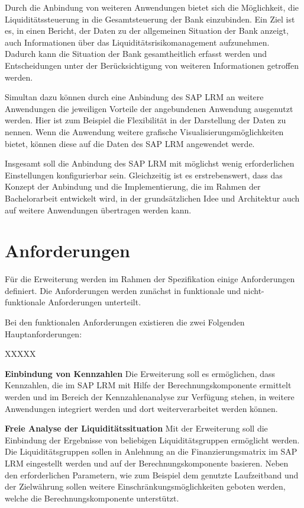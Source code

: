 \begin{onehalfspacing}
Durch die Anbindung von weiteren Anwendungen bietet sich die Möglichkeit, die  Liquiditätssteuerung in die Gesamtsteuerung der Bank einzubinden. Ein Ziel ist es, in einen Bericht, der Daten zu der allgemeinen Situation der Bank anzeigt, auch Informationen über das Liquiditätsrisikomanagement aufzunehmen. Dadurch kann die Situation der Bank gesamtheitlich erfasst werden und Entscheidungen unter der Berücksichtigung von weiteren Informationen getroffen werden.

Simultan dazu können durch eine Anbindung des SAP LRM an weitere Anwendungen die jeweiligen Vorteile der angebundenen Anwendung ausgenutzt werden. Hier ist zum Beispiel die Flexibilität in der Darstellung der Daten zu nennen. Wenn die Anwendung weitere grafische Visualisierungsmöglichkeiten bietet, können diese auf die Daten des SAP LRM angewendet werde.

Insgesamt soll die Anbindung des SAP LRM mit möglichst wenig erforderlichen Einstellungen konfigurierbar sein. Gleichzeitig ist es erstrebenswert, dass das Konzept der Anbindung und die Implementierung, die im Rahmen der Bachelorarbeit entwickelt wird, in der grundsätzlichen Idee und Architektur auch auf weitere Anwendungen übertragen werden kann.

\section{Anforderungen}
\label{sec:anforderungen}
Für die Erweiterung werden im Rahmen der Spezifikation einige Anforderungen definiert. Die Anforderungen werden zunächst in funktionale und nicht-funktionale Anforderungen unterteilt. 

Bei den funktionalen Anforderungen existieren die zwei Folgenden Hauptanforderungen:

\begin{seToplist}{ XXXXX }

\item[\anfl{kpi}] \textbf{Einbindung von Kennzahlen} \newline
Die Erweiterung soll es ermöglichen, dass Kennzahlen, die im SAP LRM  mit Hilfe der Berechnungskomponente ermittelt werden und im Bereich der Kennzahlenanalyse zur Verfügung stehen, in weitere Anwendungen integriert werden und dort weiterverarbeitet werden können.

\item[\anfl{fundingMatrix}] \textbf{Freie Analyse der Liquiditätssituation} \newline
Mit der Erweiterung soll die Einbindung der Ergebnisse von beliebigen Liquiditätsgruppen ermöglicht werden. Die Liquiditätsgruppen sollen in Anlehnung an die Finanzierungsmatrix im SAP LRM eingestellt werden und auf der Berechnungskomponente basieren. Neben den erforderlichen Parametern, wie zum Beispiel dem genutzte Laufzeitband und der Zielwährung sollen weitere Einschränkungsmöglichkeiten geboten werden, welche die Berechnungskomponente unterstützt.


\end{seToplist}
\end{onehalfspacing}
